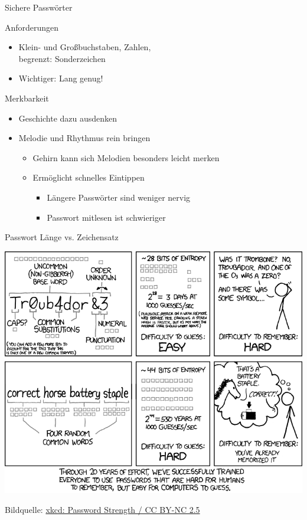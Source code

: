 \begin{frame}{Sichere Passwörter}
  \begin{block}{Anforderungen}
  \begin{itemize}
    \item Klein- und Großbuchstaben, Zahlen,\\ begrenzt: Sonderzeichen
    \item Wichtiger: Lang genug!
  \end{itemize}
  \end{block}
  \begin{block}{Merkbarkeit}
  \begin{itemize}
    \item Geschichte dazu ausdenken
    \item Melodie und Rhythmus rein bringen
    \begin{itemize}
      \item Gehirn kann sich Melodien besonders leicht merken
      \item Ermöglicht schnelles Eintippen
      \begin{itemize}
        \item Längere Passwörter sind weniger nervig
        \item Passwort mitlesen ist schwieriger
      \end{itemize}
    \end{itemize}
  \end{itemize}
  \end{block}
\end{frame}

\begin{frame}{Passwort Länge vs. Zeichensatz}
  \begin{center}
    \includegraphics[width=0.99\textheight]{images/password_strength.png}\\
  \end{center}
  \tiny Bildquelle: \href{http://xkcd.com/936/}{xkcd: Password Strength / CC BY-NC 2.5}
\end{frame}

